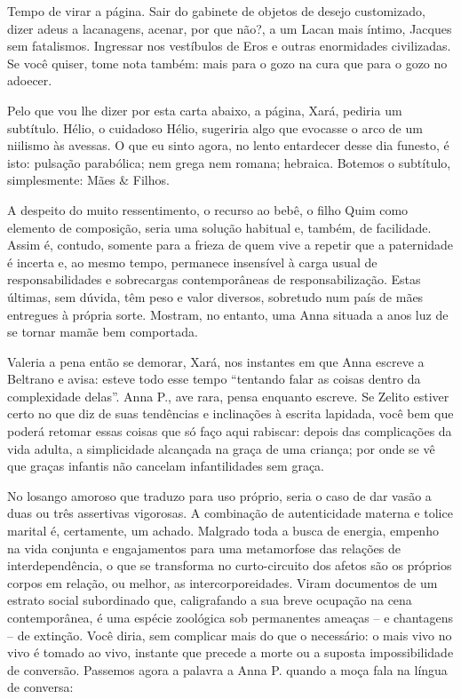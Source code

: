 Tempo de virar a página. Sair do gabinete de objetos de desejo
customizado, dizer adeus a lacanagens, acenar, por que não?, a um Lacan
mais íntimo, Jacques sem fatalismos. Ingressar nos vestíbulos de Eros e
outras enormidades civilizadas. Se você quiser, tome nota também: mais
para o gozo na cura que para o gozo no adoecer.

Pelo que vou lhe dizer por esta carta abaixo, a página, Xará, pediria um
subtítulo. Hélio, o cuidadoso Hélio, sugeriria algo que evocasse o arco
de um niilismo às avessas. O que eu sinto agora, no lento entardecer
desse dia funesto, é isto: pulsação parabólica; nem grega nem romana;
hebraica. Botemos o subtítulo, simplesmente: Mães \& Filhos.

A despeito do muito ressentimento, o recurso ao bebê, o filho Quim como
elemento de composição, seria uma solução habitual e, também, de
facilidade. Assim é, contudo, somente para a frieza de quem vive a
repetir que a paternidade é incerta e, ao mesmo tempo, permanece
insensível à carga usual de responsabilidades e sobrecargas
contemporâneas de responsabilização. Estas últimas, sem dúvida, têm peso
e valor diversos, sobretudo num país de mães entregues à própria sorte.
Mostram, no entanto, uma Anna situada a anos luz de se tornar mamãe bem
comportada.

Valeria a pena então se demorar, Xará, nos instantes em que Anna escreve
a Beltrano e avisa: esteve todo esse tempo ``tentando falar as coisas
dentro da complexidade delas''. Anna P., ave rara, pensa enquanto
escreve. Se Zelito estiver certo no que diz de suas tendências e
inclinações à escrita lapidada, você bem que poderá retomar essas coisas
que só faço aqui rabiscar: depois das complicações da vida adulta, a
simplicidade alcançada na graça de uma criança; por onde se vê que
graças infantis não cancelam infantilidades sem graça.

No losango amoroso que traduzo para uso próprio, seria o caso de dar
vasão a duas ou três assertivas vigorosas. A combinação de autenticidade
materna e tolice marital é, certamente, um achado. Malgrado toda a busca
de energia, empenho na vida conjunta e engajamentos para uma metamorfose
das relações de interdependência, o que se transforma no curto-circuito
dos afetos são os próprios corpos em relação, ou melhor, as
intercorporeidades. Viram documentos de um estrato social subordinado
que, caligrafando a sua breve ocupação na cena contemporânea, é uma
espécie zoológica sob permanentes ameaças -- e chantagens -- de
extinção. Você diria, sem complicar mais do que o necessário: o mais
vivo no vivo é tomado ao vivo, instante que precede a morte ou a suposta
impossibilidade de conversão. Passemos agora a palavra a Anna P. quando
a moça fala na língua de conversa:

